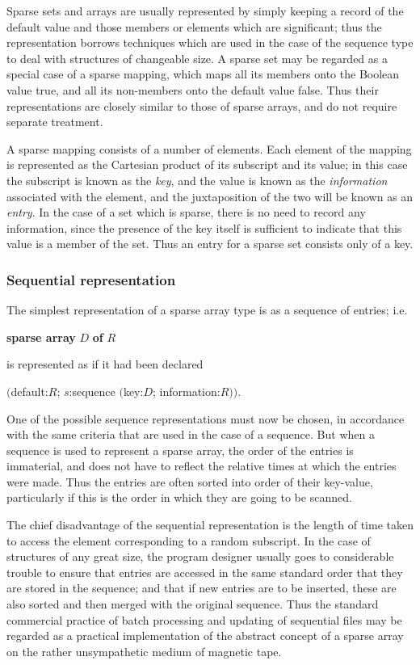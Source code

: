\noindent
Sparse sets and arrays are usually represented by simply keeping a record of the default value and those members or elements which are significant; thus the representation borrows techniques which are used in the case of the sequence type to deal with structures of changeable size. A sparse set may be regarded as a special case of a sparse mapping, which maps all its members onto the Boolean value true, and all its non-members onto the default value false. Thus their representations are closely similar to those of sparse arrays, and do not require separate treatment.

A sparse mapping consists of a number of elements. Each element of the mapping is represented as the Cartesian product of its subscript and its value; in this case the subscript is known as the \textit{key}, and the value is known as the \textit{information} associated with the element, and the juxtaposition of the two will be known as an \textit{entry}. In the case of a set which is sparse, there is no need to record any information, since the presence of the key itself is sufficient to indicate that this value is a member of the set. Thus an entry for a sparse set consists only of a key.

\subsubsection{Sequential representation}

The simplest representation of a sparse array type is as a sequence of entries;
i.e.

\quad \textbf{sparse array} $D$ \textbf{of} $R$

\noindent
is represented as if it had been declared

\quad $($default:$R$; $s$:sequence $($key:$D$; information:$R))$.

One of the possible sequence representations must now be chosen, in accordance with the same criteria that are used in the case of a sequence. But when a sequence is used to represent a sparse array, the order of the entries is immaterial, and does not have to reflect the relative times at which the entries were made. Thus the entries are often sorted into order of their
key-value, particularly if this is the order in which they are going to be scanned.

The chief disadvantage of the sequential representation is the length of time taken to access the element corresponding to a random subscript. In the case of structures of any great size, the program designer usually goes to considerable trouble to ensure that entries are accessed in the same standard order that they are stored in the sequence; and that if new entries are to be inserted, these are also sorted and then merged with the original sequence. Thus the standard commercial practice of batch processing and updating of sequential files may be regarded as a practical implementation of the abstract concept of a sparse array on the rather unsympathetic medium of magnetic tape.

